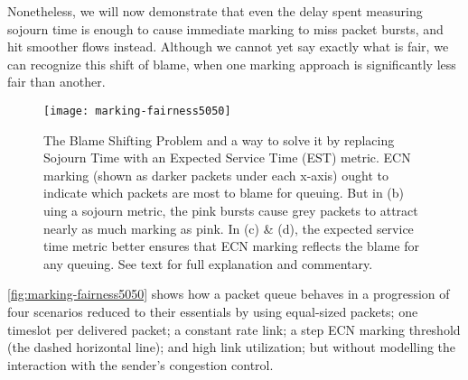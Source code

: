 Nonetheless, we will now demonstrate that even the delay spent measuring sojourn time is enough to cause immediate marking to miss packet bursts, and hit smoother flows instead. Although we cannot yet say exactly what is fair, we can recognize this shift of blame, when one marking approach is significantly less fair than another.

\begin{figure}[h]
	\centering
	\texttt{[image: marking-fairness5050]}
	\caption{The Blame Shifting Problem and a way to solve it by replacing Sojourn Time with an Expected Service Time (EST) metric. %
	ECN marking (shown as darker packets under each x-axis) ought to indicate which packets are most to blame for queuing. But in (b) uing a sojourn metric, the pink bursts cause grey packets to attract nearly as much marking as pink. In (c) \& (d), the expected service time metric better ensures that ECN marking reflects the blame for any queuing. See text for full explanation and commentary.}\label{fig:marking-fairness5050}
\end{figure}

\autoref{fig:marking-fairness5050} shows how a packet queue behaves in a progression of four scenarios reduced to their essentials by using equal-sized packets; one timeslot per delivered packet; a constant rate link; a step ECN marking threshold (the dashed horizontal line); and high link utilization; but without modelling the interaction with the sender's congestion control. 

